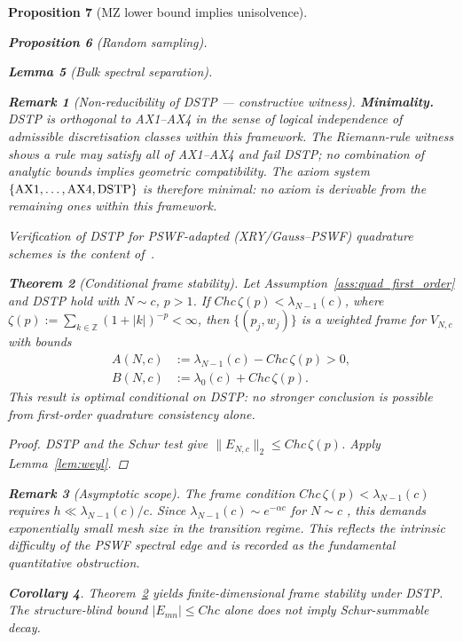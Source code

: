 \documentclass[12pt,a4paper]{amsart}
\newtheorem{theorem}{Theorem}[section]
\newtheorem{lemma}[theorem]{Lemma}
\newtheorem{proposition}[theorem]{Proposition}
\newtheorem{corollary}[theorem]{Corollary}
\theoremstyle{definition}
\newtheorem{remark}[theorem]{Remark}
\newcommand{\EN}{E_{N,c}}
\newcommand{\norm}[1]{\|#1\|}
\begin{document}
\begin{proposition}[MZ lower bound implies unisolvence]
\begin{proposition}[Random sampling]
\begin{lemma}[Bulk spectral separation]
\begin{remark}[Non-reducibility of \textup{DSTP} --- constructive witness]
\smallskip
\noindent\textbf{Minimality.}
DSTP is \emph{orthogonal} to \textup{AX1--AX4} in the sense of
logical independence of admissible discretisation classes within
this framework. The Riemann-rule witness shows a rule may satisfy
all of \textup{AX1--AX4} and fail DSTP; no combination of analytic
bounds implies geometric compatibility.
The axiom system $\{\textup{AX1},\dots,\textup{AX4},\textup{DSTP}\}$
is therefore minimal: no axiom is derivable from the remaining ones
within this framework.

Verification of DSTP for PSWF-adapted (XRY/Gauss--PSWF) quadrature
schemes is the content of~\cite{PaperIIquad}.
\end{remark}

\begin{theorem}[Conditional frame stability]%
\label{thm:conditional_frame_schur}
Let Assumption~\ref{ass:quad_first_order} and DSTP hold with $N\sim c$,
$p>1$. If $Chc\,\zeta(p)<\lambda_{N-1}(c)$,
where $\zeta(p):=\sum_{k\in\mathbb{Z}}(1+|k|)^{-p}<\infty$, then
$\{(p_j,w_j)\}$ is a weighted frame for $V_{N,c}$ with bounds
\begin{align*}
  A(N,c)&:=\lambda_{N-1}(c)-Chc\,\zeta(p)>0,\\
  B(N,c)&:=\lambda_0(c)+Chc\,\zeta(p).
\end{align*}
This result is optimal conditional on DSTP: no stronger conclusion
is possible from first-order quadrature consistency alone.
\end{theorem}
\begin{proof}
DSTP and the Schur test give
$\norm{\EN}_2\le Chc\,\zeta(p)$.
Apply Lemma~\ref{lem:weyl}.
\end{proof}

\begin{remark}[Asymptotic scope]\label{rem:asymptotic_scope}
The frame condition $Chc\,\zeta(p)<\lambda_{N-1}(c)$ requires
$h\ll\lambda_{N-1}(c)/c$. Since $\lambda_{N-1}(c)\sim e^{-\alpha c}$
for $N\sim c$ \cite{BonamiKaroui}, this demands exponentially small
mesh size in the transition regime. This reflects the intrinsic
difficulty of the PSWF spectral edge and is recorded as the
fundamental quantitative obstruction.
\end{remark}

\begin{corollary}\label{cor:fixed_param_scope}
Theorem~\ref{thm:conditional_frame_schur} yields finite-dimensional
frame stability under DSTP. The structure-blind bound
$|E_{mn}|\le Chc$ alone does not imply Schur-summable decay.
\end{corollary}


\end{lemma}
\end{proposition}
\end{proposition}
\end{document}

